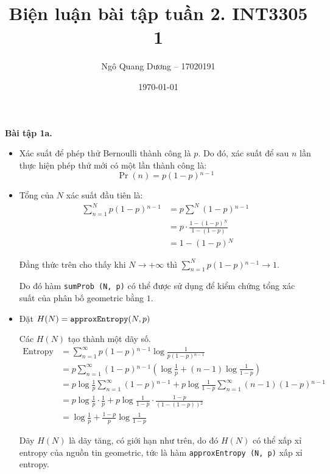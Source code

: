 \documentclass{article}
\title{Biện luận bài tập tuần 2. INT3305 1}
\author{Ngô Quang Dương -- 17020191}
\date{\today}
\begin{document}
\maketitle

\par\textbf{Bài tập 1a.}

\begin{itemize}
    \item Xác suất để phép thử Bernoulli thành công là $p$. Do đó, xác suất để sau $n$ lần thực hiện phép thử mới có một lần thành công là:
        \[ \Pr(n) = p(1-p){}^{n-1} \]
    \item Tổng của $N$ xác suất đầu tiên là:
        \begin{align*}
            \sum^{N}_{n=1}p(1-p){}^{n-1} &= p\sum^{N}(1-p){}^{n-1} \\
                                       &= p\cdot\frac{1 - (1 - p){}^{N}}{1 - (1-p)} \\
                                       &= 1 - (1 - p){}^{N}
        \end{align*}
        \par Đẳng thức trên cho thấy khi $N\to+\infty$ thì $\displaystyle\sum\limits^{N}_{n=1}p(1-p){}^{n-1}\to 1$.
        \par Do đó hàm \texttt{sumProb (N, p)} có thể được sử dụng để kiểm chứng tổng xác suất của phân bố geometric bằng $1$.
    \item Đặt $H(N) = \text{\texttt{approxEntropy}}(N,p)$
        \par Các $H(N)$ tạo thành một dãy số.
        \begin{align*}
            \text{Entropy} &= \sum^{\infty}_{n=1}p(1-p){}^{n-1}\log\frac{1}{p(1-p){}^{n-1}} \\
                 &= p\sum^{\infty}_{n=1}(1-p){}^{n-1}\left(\log\frac{1}{p} + (n-1)\log\frac{1}{1-p}\right) \\
                 &= p\log\frac{1}{p}\sum^{\infty}_{n=1}(1-p){}^{n-1} + p\log\frac{1}{1-p}\sum^{\infty}_{n=1}(n-1)(1-p){}^{n-1} \\
                 &= p\log\frac{1}{p}\cdot\frac{1}{p} + p\log\frac{1}{1-p}\cdot\frac{1-p}{(1-(1-p)){}^{2}} \\
                 &= \log\frac{1}{p} + \frac{1-p}{p}\log\frac{1}{1-p}
        \end{align*}
        \par Dãy $H(N)$ là dãy tăng, có giới hạn như trên, do đó $H(N)$ có thể xấp xỉ entropy của nguồn tin geometric, tức là hàm \texttt{approxEntropy (N, p)} xấp xỉ entropy.
\end{itemize}
\end{document}
